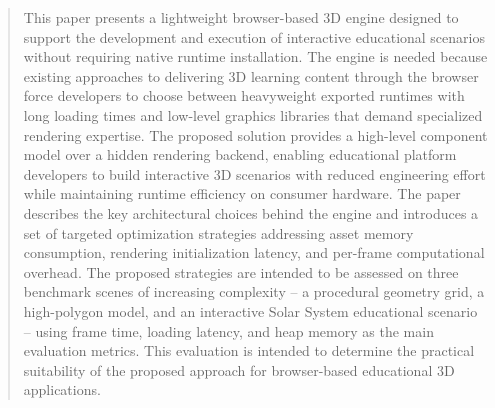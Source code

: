 \begin{abstract}
This paper presents a lightweight browser-based 3D engine designed to support the development and execution of interactive educational scenarios without requiring native runtime installation. The engine is needed because existing approaches to delivering 3D learning content through the browser force developers to choose between heavyweight exported runtimes with long loading times and low-level graphics libraries that demand specialized rendering expertise. The proposed solution provides a high-level component model over a hidden rendering backend, enabling educational platform developers to build interactive 3D scenarios with reduced engineering effort while maintaining runtime efficiency on consumer hardware. The paper describes the key architectural choices behind the engine and introduces a set of targeted optimization strategies addressing asset memory consumption, rendering initialization latency, and per-frame computational overhead. The proposed strategies are intended to be assessed on three benchmark scenes of increasing complexity -- a procedural geometry grid, a high-polygon model, and an interactive Solar System educational scenario -- using frame time, loading latency, and heap memory as the main evaluation metrics. This evaluation is intended to determine the practical suitability of the proposed approach for browser-based educational 3D applications.


\end{abstract}